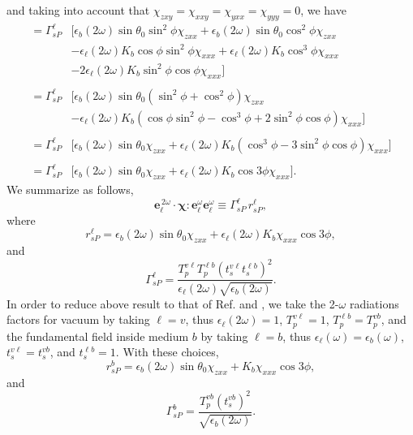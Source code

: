 and taking into account that $\chi_{zxy} = \chi_{xxy} = \chi_{yxx} = \chi_{yyy}
= 0$, we have
\begin{equation*}
\begin{split}
= \Gamma^{\ell}_{sP}
&\big[
   \epsilon_{b}(2\omega)\sin\theta_{0}\sin^{2}\phi\chi_{zxx}
 + \epsilon_{b}(2\omega)\sin\theta_{0}\cos^{2}\phi\chi_{zxx}\\
&- \epsilon_{\ell}(2\omega)K_{b}\cos\phi\sin^{2}\phi\chi_{xxx}
 + \epsilon_{\ell}(2\omega)K_{b}\cos^{3}\phi\chi_{xxx}\\
&- 2\epsilon_{\ell}(2\omega)K_{b}\sin^{2}\phi\cos\phi\chi_{xxx}
\big]\\\\
= \Gamma^{\ell}_{sP}
&\big[
\epsilon_{b}(2\omega)\sin\theta_{0}
(\sin^{2}\phi + \cos^{2}\phi)\chi_{zxx}\\
&- \epsilon_{\ell}(2\omega)K_{b}
(\cos\phi\sin^{2}\phi - \cos^{3}\phi + 2\sin^{2}\phi\cos\phi)\chi_{xxx}
\big]\\\\
= \Gamma^{\ell}_{sP}
&\big[
  \epsilon_{b}(2\omega)\sin\theta_{0}\chi_{zxx} 
+ \epsilon_{\ell}(2\omega)K_{b}(\cos^{3}\phi - 3\sin^{2}\phi\cos\phi)\chi_{xxx}
\big]\\\\
= \Gamma^{\ell}_{sP}
&\big[
  \epsilon_{b}(2\omega)\sin\theta_{0}\chi_{zxx}
+ \epsilon_{\ell}(2\omega)K_{b}\cos3\phi\chi_{xxx}
\big].
\end{split}
\end{equation*}
We summarize as follows,
\begin{equation*}
\mathbf{e}^{\,2\omega}_{\ell}\cdot
\boldsymbol{\chi}:\mathbf{e}^\omega_{\ell}\mathbf{e}^\omega_{\ell}
\equiv\Gamma^{\ell}_{sP}\, r^{\ell}_{sP},
\end{equation*}
where
\begin{equation*}
r^{\ell}_{sP}
= \epsilon_{b}(2\omega)\sin\theta_{0}\chi_{zxx}
+ \epsilon_{\ell}(2\omega)K_{b}\chi_{xxx}\cos3\phi,
\end{equation*} 
and  
\begin{equation*}
\Gamma^{\ell}_{sP}=
\frac{T_{p}^{v\ell}T^{\ell b}_{p}\left(t_s^{v\ell}t^{\ell b}_s\right)^2}
     {\epsilon_{\ell}(2\omega)\sqrt{\epsilon_{b}(2\omega)}}.  
\end{equation*} 
In order to reduce above result to that of Ref. \cite{mizrahiJOSA88} and
\cite{sipePRB87},  we take the 2-$\omega$ radiations factors for vacuum by
taking $\ell=v$, thus $\epsilon_{\ell}(2\omega)=1$, $T^{v\ell}_{p}=1$,
$T^{\ell b}_{p}=T^{vb}_{p}$, and the fundamental field inside medium $b$ by
taking $\ell=b$, thus $\epsilon_{\ell}(\omega)=\epsilon_{b}(\omega)$,
$t^{v\ell}_s=t^{vb}_s$, and $t^{\ell b}_s=1$. With these choices,
\begin{equation*}
r^{b}_{sP} = \epsilon_{b}(2\omega)\sin\theta_{0}\chi_{zxx}
+ K_{b}\chi_{xxx}\cos3\phi,
\end{equation*} 
and 
\begin{equation*}
\Gamma^{b}_{sP} =
\frac{T^{v b}_{p}(t_s^{vb})^{2}}{\sqrt{\epsilon_{b}(2\omega)}}.  
\end{equation*}


